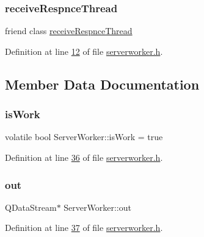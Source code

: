 \subsubsection{\texorpdfstring{receive\+Respnce\+Thread}{receiveRespnceThread}}
{\footnotesize\ttfamily friend class \hyperlink{a00221}{receive\+Respnce\+Thread}\hspace{0.3cm}{\ttfamily [friend]}}



Definition at line \hyperlink{a00110_source_l00012}{12} of file \hyperlink{a00110_source}{serverworker.\+h}.



\subsection{Member Data Documentation}
\mbox{\label{a00185_a237b637e43a66980b16463bab0b38ce4}} 
\subsubsection{\texorpdfstring{is\+Work}{isWork}}
{\footnotesize\ttfamily volatile bool Server\+Worker\+::is\+Work = true\hspace{0.3cm}{\ttfamily [protected]}}



Definition at line \hyperlink{a00110_source_l00036}{36} of file \hyperlink{a00110_source}{serverworker.\+h}.

\mbox{\label{a00185_aa17ea4dcd487fd8bd6aab748d496a561}} 
\subsubsection{\texorpdfstring{out}{out}}
{\footnotesize\ttfamily Q\+Data\+Stream$\ast$ Server\+Worker\+::out\hspace{0.3cm}{\ttfamily [protected]}}



Definition at line \hyperlink{a00110_source_l00037}{37} of file \hyperlink{a00110_source}{serverworker.\+h}.

\mbox{\label{a00205_aa57ce2f74f8ad76abb38974f85b97ac5}} 
